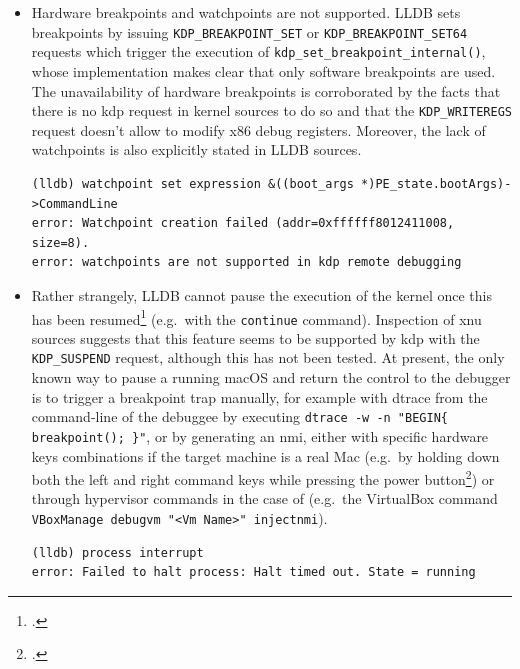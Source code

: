 \begin{itemize}
    \item Hardware breakpoints and watchpoints are not supported. LLDB sets breakpoints by issuing \lstinline{KDP_BREAKPOINT_SET} or \lstinline{KDP_BREAKPOINT_SET64} requests which trigger the execution of \lstinline{kdp_set_breakpoint_internal()}, whose implementation makes clear that only software breakpoints are used. The unavailability of hardware breakpoints is corroborated by the facts that there is no \gls{kdp} request in kernel sources to do so and that the \lstinline{KDP_WRITEREGS} request doesn't allow to modify \gls{x86} debug registers. Moreover, the lack of watchpoints is also explicitly stated in LLDB sources.

\begin{lstlisting}[style=lldbsession,caption={Trying to set watchpoints in a \gls{kdp} debugging} session]
(lldb) watchpoint set expression &((boot_args *)PE_state.bootArgs)->CommandLine
error: Watchpoint creation failed (addr=0xffffff8012411008, size=8).
error: watchpoints are not supported in kdp remote debugging
\end{lstlisting}

    \item Rather strangely, LLDB cannot pause the execution of the kernel once this has been resumed\footcite{MacOSDebug7} (e.g.\ with the \lstinline{continue} command). Inspection of \gls{xnu} sources suggests that this feature seems to be supported by \gls{kdp} with the \lstinline{KDP_SUSPEND} request, although this has not been tested. At present, the only known way to pause a running macOS and return the control to the debugger is to trigger a breakpoint trap manually, for example with \gls{dtrace} from the command-line of the debuggee by executing \lstinline|dtrace -w -n "BEGIN{ breakpoint(); }"|, or by generating an \gls{nmi}, either with specific hardware keys combinations if the target machine is a real Mac (e.g.\ by holding down both the left and right command keys while pressing the power button\footcite{DarwinDoc9}) or through hypervisor commands in the case of  (e.g.\ the VirtualBox command \lstinline{VBoxManage debugvm "<Vm Name>" injectnmi}).

\begin{lstlisting}[style=lldbsession,caption={Trying to interrupt a \gls{kdp} debugging} session]
(lldb) process interrupt
error: Failed to halt process: Halt timed out. State = running
\end{lstlisting}


\end{itemize}
